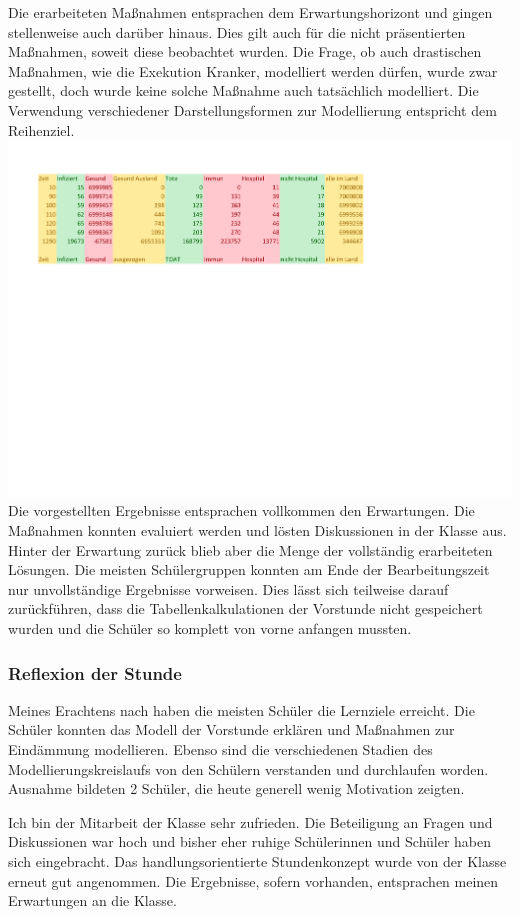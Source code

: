 Die erarbeiteten Maßnahmen entsprachen dem Erwartungshorizont und gingen stellenweise auch darüber hinaus. Dies gilt auch für die nicht präsentierten Maßnahmen, soweit diese beobachtet wurden. Die Frage, ob auch drastischen Maßnahmen, wie die Exekution Kranker, modelliert werden dürfen, wurde zwar gestellt, doch wurde keine solche Maßnahme auch tatsächlich modelliert. Die Verwendung verschiedener Darstellungsformen zur Modellierung entspricht dem Reihenziel.
\includegraphics[width=\textwidth]{projekt/leistung_3_2}
Die vorgestellten Ergebnisse entsprachen vollkommen den Erwartungen. Die Maßnahmen konnten evaluiert werden und lösten Diskussionen in der Klasse aus. Hinter der Erwartung zurück blieb aber die Menge der vollständig erarbeiteten Lösungen. Die meisten Schülergruppen konnten am Ende der Bearbeitungszeit nur unvollständige Ergebnisse vorweisen. Dies lässt sich teilweise darauf zurückführen, dass die Tabellenkalkulationen der Vorstunde nicht gespeichert wurden und die Schüler so komplett von vorne anfangen mussten. 
\subsubsection{Reflexion der Stunde}
Meines Erachtens nach haben die meisten Schüler die Lernziele erreicht. Die Schüler konnten das Modell der Vorstunde erklären und Maßnahmen zur Eindämmung modellieren. Ebenso sind die verschiedenen Stadien des Modellierungskreislaufs von den Schülern verstanden und durchlaufen worden. Ausnahme bildeten 2 Schüler, die heute generell wenig Motivation zeigten. 

Ich bin der Mitarbeit der Klasse sehr zufrieden. Die Beteiligung an Fragen und Diskussionen war hoch und bisher eher ruhige Schülerinnen und Schüler haben sich eingebracht. Das handlungsorientierte Stundenkonzept wurde von der Klasse erneut gut angenommen. Die Ergebnisse, sofern vorhanden, entsprachen meinen Erwartungen an die Klasse.

